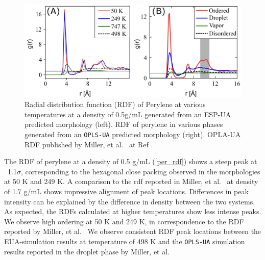 \begin{figure}[ht!]
    \centering
    \includegraphics[width=1\textwidth]{src/figures/FF_figs/per_rdf.png} %
    \caption{Radial distribution function (RDF) of Perylene at various temperatures at a density of 0.5g/mL generated from an ESP-UA predicted morphology (left). RDF of perylene in various phases generated from an \texttt{OPLS-UA} predicted morphology (right). OPLA-UA RDF published by Miller, et al.~ at Ref \citep{miller_enhanced_2017}.}
    \label{per_rdf}
\end{figure}
The RDF of perylene at a density of 0.5 g/mL (\autoref{per_rdf}) shows a steep peak at ~1.1$\sigma$, corresponding to the hexagonal close packing observed in the morphologies at 50 K and 249 K. A comparison to the rdf reported in Miller, et al.~ at density of 1.7 g/mL shows impressive alignment of peak locations. Differences in peak intensity can be explained by the difference in density between the two systems. As expected, the RDFs calculated  at higher temperatures show less intense peaks. We observe high ordering at 50 K and 249 K, in correspondence to the RDF reported by Miller, et al.~ We observe consistent RDF peak locations between the EUA-simulation results at temperature of 498 K and the \texttt{OPLS-UA} simulation results reported in the droplet phase by Miller, et al.~ 
